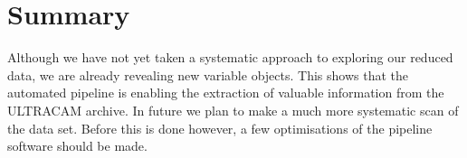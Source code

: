   
\section{Summary}
Although we have not yet taken a systematic approach to exploring our reduced data, we are already revealing new variable objects. This shows that the automated pipeline is enabling the extraction of valuable information from the ULTRACAM archive. In future we plan to make a much more systematic scan of the data set. Before this is done however, a few optimisations of the pipeline software should be made. 